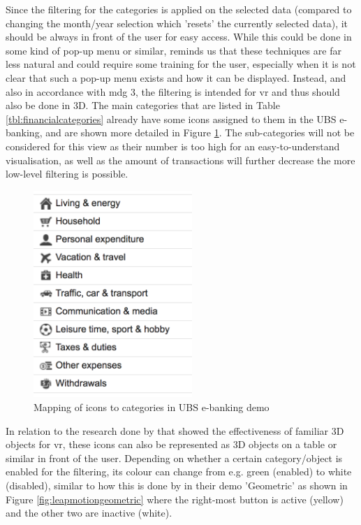 Since the filtering for the categories is applied on the selected data (compared to changing the month/year selection which 'resets' the currently selected data), it should be always in front of the user for easy access. While this could be done in some kind of pop-up menu or similar, \cite{Bowman2002} reminds us that these techniques are far less natural and could require some training for the user, especially when it is not clear that such a pop-up menu exists and how it can be displayed. Instead, and also in accordance with \gls{mdg} 3, the filtering is intended for \gls{vr} and thus should also be done in 3D. The main categories that are listed in Table \ref{tbl:financialcategories} already have some icons assigned to them in the UBS e-banking, and are shown more detailed in Figure \ref{fig:categoriesicons}. The sub-categories will not be considered for this view as their number is too high for an easy-to-understand visualisation, as well as the amount of transactions will further decrease the more low-level filtering is possible.
\begin{figure}[h]
	\begin{center}
		\includegraphics[width=6cm]{03_Figures/07_Suggestion/UBSAG2016_CategoriesIcons.png}
		\caption[Mapping of icons to categories in UBS e-banking demo]{Mapping of icons to categories in UBS e-banking demo \citep{UBSAG2016}}
		\label{fig:categoriesicons}
	\end{center}
\end{figure} \newline
In relation to the research done by \cite{Jamieson2007} that showed the effectiveness of familiar 3D objects for \gls{vr}, these icons can also be represented as 3D objects on a table or similar in front of the user. Depending on whether a certain category/object is enabled for the filtering, its colour can change from e.g. green (enabled) to white (disabled), similar to how this is done by \cite{LeapMotion2016} in their demo 'Geometric' as shown in Figure \ref{fig:leapmotiongeometric} where the right-most button is active (yellow) and the other two are inactive (white).
